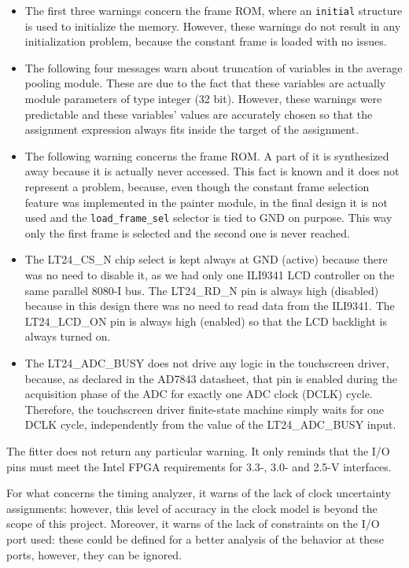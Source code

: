 \documentclass[11pt]{report}
\begin{document}
\begin{itemize}
    \item The first three warnings concern the frame ROM, where an \texttt{initial} structure is used to initialize the memory. However, these warnings do not result in any initialization problem, because the constant frame is loaded with no issues.
    \item The following four messages warn about truncation of variables in the average pooling module. These are due to the fact that these variables are actually module parameters of type integer (32 bit). However, these warnings were predictable and these variables' values are accurately chosen so that the assignment expression always fits inside the target of the assignment.
    \item The following warning concerns the frame ROM. A part of it is synthesized away because it is actually never accessed. This fact is known and it does not represent a problem, because, even though the constant frame selection feature was implemented in the painter module, in the final design it is not used and the \texttt{load\_frame\_sel} selector is tied to GND on purpose. This way only the first frame is selected and the second one is never reached.
    \item The LT24\_CS\_N chip select is kept always at GND (active) because there was no need to disable it, as we had only one ILI9341 LCD controller on the same parallel 8080-I bus. The LT24\_RD\_N pin is always high (disabled) because in this design there was no need to read data from the ILI9341. The LT24\_LCD\_ON pin is always high (enabled) so that the LCD backlight is always turned on.
    \item The LT24\_ADC\_BUSY does not drive any logic in the touchscreen driver, because, as declared in the AD7843 datasheet, that pin is enabled during the acquisition phase of the ADC for exactly one ADC clock (DCLK) cycle. Therefore, the touchscreen driver finite-state machine simply waits for one DCLK cycle, independently from the value of the  LT24\_ADC\_BUSY input. 
\end{itemize}

\bigskip

The fitter does not return any particular warning. It only reminds that the I/O pins must meet the Intel FPGA requirements for 3.3-, 3.0- and 2.5-V interfaces.

\bigskip

For what concerns the timing analyzer, it warns of the lack of clock uncertainty assignments: however, this level of accuracy in the clock model is beyond the scope of this project. Moreover, it warns of the lack of constraints on the I/O port used: these could be defined for a better analysis of the behavior at these ports, however, they can be ignored.
\end{document}

